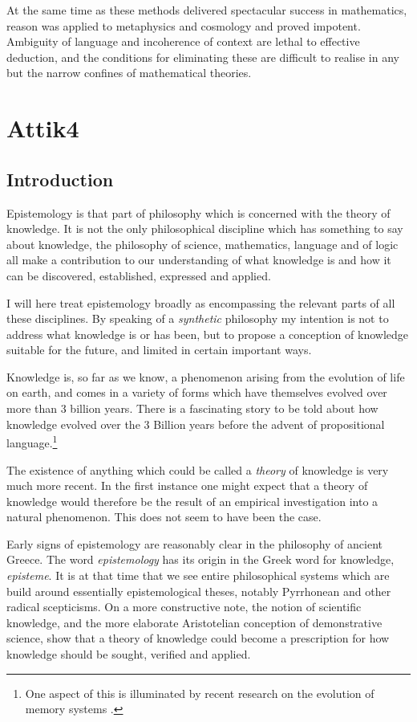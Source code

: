 \documentclass[10pt,titlepage]{book}
\begin{document}
At the same time as these methods delivered spectacular success in mathematics, reason was applied to metaphysics and cosmology and proved impotent.
Ambiguity of language and incoherence of context are lethal to effective deduction, and the conditions for eliminating these are difficult to realise in any but the narrow confines of mathematical theories.


\chapter{Attik4}

\section{Introduction}

Epistemology is that part of philosophy which is concerned with the theory of knowledge.
It is not the only philosophical discipline which has something to say about knowledge, the philosophy of science, mathematics, language and of logic all make a contribution to our understanding of what knowledge is and how it can be discovered, established, expressed and applied.

I will here treat epistemology broadly as encompassing the relevant parts of all these disciplines.
By speaking of a \emph{synthetic} philosophy my intention is not to address what knowledge is or has been, but to propose a conception of knowledge suitable for the future, and limited in certain important ways.

Knowledge is, so far as we know, a phenomenon arising from the evolution of life on earth, and comes in a variety of forms which have themselves evolved over more than 3 billion years.
There is a fascinating story to be told about how knowledge evolved over the 3 Billion years before the advent of propositional language.\footnote{One aspect of this is illuminated by recent research on the evolution of memory systems \cite{murray2017evolution}.}

The existence of anything which could be called a \emph{theory} of knowledge is very much more recent.
In the first instance one might expect that a theory of knowledge would therefore be the result of an empirical investigation into a natural phenomenon.
This does not seem to have been the case.

Early signs of epistemology are reasonably clear in the philosophy of ancient Greece.
The word \emph{epistemology} has its origin in the Greek word for knowledge, \emph{episteme}.
 It is at that time that we see entire philosophical systems which are build around essentially epistemological theses, notably Pyrrhonean and other radical scepticisms.
 On a more constructive note, the notion of scientific knowledge, and the more elaborate Aristotelian conception of demonstrative science, show that a theory of knowledge could become a prescription for how knowledge should be sought, verified and applied.
\end{document}
